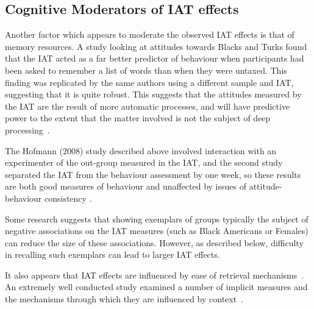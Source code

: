 \subsection{Cognitive Moderators of IAT effects}
\label{sec:cogn-moder-iat}



Another factor which appears to moderate the observed IAT effects is that of memory resources. A study looking at attitudes towards Blacks and Turks \cite{Hofmann2008a} found that the IAT acted as a far better predictor of behaviour when participants had been asked to remember a list of words than when they were untaxed. This finding was replicated by the same authors using a different sample and IAT, suggesting that it is quite robust.  This suggests that the attitudes measured by the IAT are the result of more automatic processes, and will have predictive power to the extent that the matter involved is not the subject of deep processing~\cite{Kahneman2002}. 

The Hofmann (2008) study described above involved interaction with an experimenter of the out-group measured in the IAT, and the second study separated the IAT from the behaviour assessment by one week, so these results are both good measures of behaviour and unaffected by  issues of attitude-behaviour consistency . 


Some research \cite{Dasgupta2001} suggests that showing exemplars of groups typically the subject of negative associations on the IAT measures (such as Black Americans or Females) can reduce the size of these associations. However, as described below, difficulty in recalling such exemplars can lead to larger IAT effects. 

It also appears that IAT effects are influenced by ease of retrieval mechanisms~\cite{Kahneman2002}. An extremely well conducted study examined a number of implicit measures and the mechanisms through which they are influenced by context~\cite{Gawronski2005}. 

